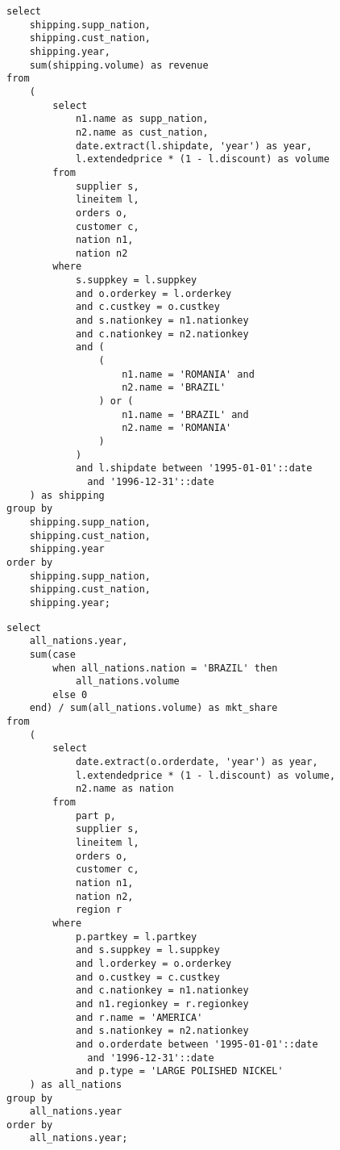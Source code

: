\begin{listing}[!ht]
\begin{verbatim}
select
    shipping.supp_nation,
    shipping.cust_nation,
    shipping.year,
    sum(shipping.volume) as revenue
from
    (
        select
            n1.name as supp_nation,
            n2.name as cust_nation,
            date.extract(l.shipdate, 'year') as year,
            l.extendedprice * (1 - l.discount) as volume
        from
            supplier s,
            lineitem l,
            orders o,
            customer c,
            nation n1,
            nation n2
        where
            s.suppkey = l.suppkey
            and o.orderkey = l.orderkey
            and c.custkey = o.custkey
            and s.nationkey = n1.nationkey
            and c.nationkey = n2.nationkey
            and (
                (
                    n1.name = 'ROMANIA' and
                    n2.name = 'BRAZIL'
                ) or (
                    n1.name = 'BRAZIL' and
                    n2.name = 'ROMANIA'
                )
            )
            and l.shipdate between '1995-01-01'::date
              and '1996-12-31'::date
    ) as shipping
group by
    shipping.supp_nation,
    shipping.cust_nation,
    shipping.year
order by
    shipping.supp_nation,
    shipping.cust_nation,
    shipping.year;
\end{verbatim}
\caption{Volume Shipping Query}
\end{listing}

\begin{listing}[!ht]
\begin{verbatim}
select
    all_nations.year,
    sum(case
        when all_nations.nation = 'BRAZIL' then
            all_nations.volume
        else 0
    end) / sum(all_nations.volume) as mkt_share
from
    (
        select
            date.extract(o.orderdate, 'year') as year,
            l.extendedprice * (1 - l.discount) as volume,
            n2.name as nation
        from
            part p,
            supplier s,
            lineitem l,
            orders o,
            customer c,
            nation n1,
            nation n2,
            region r
        where
            p.partkey = l.partkey
            and s.suppkey = l.suppkey
            and l.orderkey = o.orderkey
            and o.custkey = c.custkey
            and c.nationkey = n1.nationkey
            and n1.regionkey = r.regionkey
            and r.name = 'AMERICA'
            and s.nationkey = n2.nationkey
            and o.orderdate between '1995-01-01'::date
              and '1996-12-31'::date
            and p.type = 'LARGE POLISHED NICKEL'
    ) as all_nations
group by
    all_nations.year
order by
    all_nations.year;
\end{verbatim}
\caption{National Market Share Query}
\end{listing}

